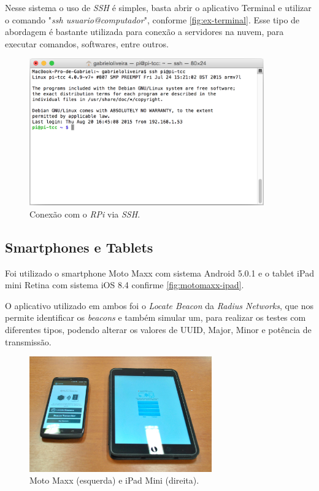 \documentclass[
		12pt,				%
		openright,			%
		oneside,			%
		a4paper,			%
		chapter=TITLE,		%
		english,			%
		brazil				%
	]{abntex2}
\begin{document}
Nesse sistema o uso de \textit{SSH} é simples, basta abrir o aplicativo Terminal e utilizar o comando "\textit{ssh usuario@computador}", conforme \autoref{fig:ex-terminal}. Esse tipo de abordagem é bastante utilizada para conexão a servidores na nuvem, para executar comandos, softwares, entre outros.

\begin{figure}[htb]
	\caption{\label{fig:ex-terminal}Conexão com o \textit{RPi} via \textit{SSH}.}
	\begin{center}
		\includegraphics[width=0.9\textwidth]{img/terminal-pi.png}
	\end{center}
\end{figure}

\subsection{Smartphones e Tablets}\label{sec:smartphone-tablets}

Foi utilizado o smartphone Moto Maxx com sistema Android 5.0.1 e o tablet iPad mini Retina com sistema iOS 8.4 confirme \autoref{fig:motomaxx-ipad}. 

O aplicativo utilizado em ambos foi o \textit{Locate Beacon} da \textit{Radius Networks}, que nos permite identificar os \textit{beacons} e também simular um, para realizar os testes com diferentes tipos, podendo alterar os valores de UUID, Major, Minor e potência de transmissão. 

\begin{figure}[htb]
	\caption{\label{fig:motomaxx-ipad}Moto Maxx (esquerda) e iPad Mini (direita).}
	\begin{center}
		\includegraphics[width=0.7\textwidth]{img/motomaxx-ipad.jpg}
	\end{center}
\end{figure}
\end{document}
